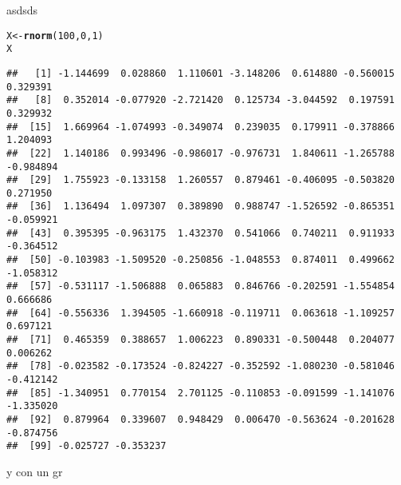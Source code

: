 \documentclass[spanish]{article}\usepackage{graphicx, color}
\makeatletter
\newcommand{\hlfunctioncall}[1]{\textcolor[rgb]{0.501960784313725,0,0.329411764705882}{\textbf{#1}}}%
\newenvironment{kframe}{%
 \def\at@end@of@kframe{}%
 \ifinner\ifhmode%
  \def\at@end@of@kframe{\end{minipage}}%
  \begin{minipage}{\columnwidth}%
 \fi\fi%
 \def\FrameCommand##1{\hskip\@totalleftmargin \hskip-\fboxsep
 \colorbox{shadecolor}{##1}\hskip-\fboxsep
     \hskip-\linewidth \hskip-\@totalleftmargin \hskip\columnwidth}%
 \MakeFramed {\advance\hsize-\width
   \@totalleftmargin\z@ \linewidth\hsize
   \@setminipage}}%
 {\par\unskip\endMakeFramed%
 \at@end@of@kframe}
\newenvironment{knitrout}{}{} %
\makeatother
\begin{document}
asdsds

\begin{knitrout}
\color{fgcolor}\begin{kframe}
\begin{alltt}
X <- \hlfunctioncall{rnorm}(100, 0, 1)
X
\end{alltt}
\begin{verbatim}
##   [1] -1.144699  0.028860  1.110601 -3.148206  0.614880 -0.560015  0.329391
##   [8]  0.352014 -0.077920 -2.721420  0.125734 -3.044592  0.197591  0.329932
##  [15]  1.669964 -1.074993 -0.349074  0.239035  0.179911 -0.378866  1.204093
##  [22]  1.140186  0.993496 -0.986017 -0.976731  1.840611 -1.265788 -0.984894
##  [29]  1.755923 -0.133158  1.260557  0.879461 -0.406095 -0.503820  0.271950
##  [36]  1.136494  1.097307  0.389890  0.988747 -1.526592 -0.865351 -0.059921
##  [43]  0.395395 -0.963175  1.432370  0.541066  0.740211  0.911933 -0.364512
##  [50] -0.103983 -1.509520 -0.250856 -1.048553  0.874011  0.499662 -1.058312
##  [57] -0.531117 -1.506888  0.065883  0.846766 -0.202591 -1.554854  0.666686
##  [64] -0.556336  1.394505 -1.660918 -0.119711  0.063618 -1.109257  0.697121
##  [71]  0.465359  0.388657  1.006223  0.890331 -0.500448  0.204077  0.006262
##  [78] -0.023582 -0.173524 -0.824227 -0.352592 -1.080230 -0.581046 -0.412142
##  [85] -1.340951  0.770154  2.701125 -0.110853 -0.091599 -1.141076 -1.335020
##  [92]  0.879964  0.339607  0.948429  0.006470 -0.563624 -0.201628 -0.874756
##  [99] -0.025727 -0.353237
\end{verbatim}
\end{kframe}
\end{knitrout}


%
y con un gr
\end{document}
